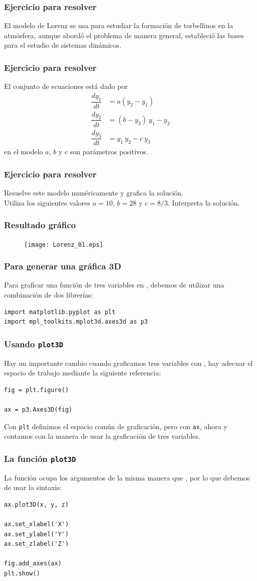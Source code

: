 \begin{frame}
\frametitle{Ejercicio para resolver}
El modelo de Lorenz se usa para estudiar la formación de torbellinos en la atmósfera, aunque abordó el problema de manera general, estableció las bases para el estudio de sistemas dinámicos.
\end{frame}
\begin{frame}
\frametitle{Ejercicio para resolver}
El conjunto de ecuaciones está dado por
\begin{align*}
\dfrac{dy_{1}}{dt} &= a(y_{2} - y_{1}) \\
\dfrac{dy_{2}}{dt} &= (b - y_{3}) \: y_{1} - y_{2} \\
\dfrac{dy_{3}}{dt} &= y_{1} \: y_{2} - c \: y_{3}
\end{align*}
en el modelo $a$, $b$ y $c$ son parámetros positivos. 
\end{frame}
\begin{frame}
\frametitle{Ejercicio para resolver}
Resuelve este modelo numéricamente y grafica la solución.
\\
\bigskip
Utiliza los siguientes valores $a = 10$, $b = 28$ y $c =    8/3$. Interpreta la solución.
\end{frame}
\begin{frame}[plain]
\frametitle{Resultado gráfico}
\begin{figure}
    \centering
    \texttt{[image: Lorenz\_01.eps]} 
\end{figure}
\end{frame}
\begin{frame}[fragile]
\frametitle{Para generar una gráfica 3D}
Para graficar una función de tres variables en , debemos de utilizar una combinación de dos librerías:
\begin{verbatim}
import matplotlib.pyplot as plt
import mpl_toolkits.mplot3d.axes3d as p3
\end{verbatim}    
\end{frame}
\begin{frame}[fragile]
\frametitle{Usando \texttt{plot3D}}
Hay un importante cambio cuando graficamos tres variables con , hay adecuar el espacio de trabajo mediante la siguiente referencia:
\begin{verbatim}
fig = plt.figure()

ax = p3.Axes3D(fig)
\end{verbatim}
Con \texttt{plt} definimos el espacio común de graficación, pero con \texttt{ax}, ahora y contamos con la manera de usar la graficación de tres variables.
\end{frame}
\begin{frame}[fragile]
\frametitle{La función \texttt{plot3D}}
La función  ocupa los argumentos de la misma manera que , por lo que debemos de usar la sintaxis:
\begin{verbatim}
ax.plot3D(x, y, z)

ax.set_xlabel('X')
ax.set_ylabel('Y')
ax.set_zlabel('Z')

fig.add_axes(ax)
plt.show()
\end{verbatim}
\end{frame}
